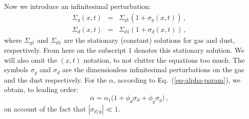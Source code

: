 \documentclass{aa}
\def\comma{\,,}
\begin{document}
Now we introduce an infinitesimal perturbation:
\begin{eqnarray}
\Sigma_g(x,t) &=& \Sigma_{g1} (1+\sigma_g(x,t))\comma\label{eq-simpl-sigma-g-pert}\\
\Sigma_d(x,t) &=& \Sigma_{d1} (1+\sigma_d(x,t))\comma\label{eq-simpl-sigma-d-pert}
\end{eqnarray}
where $\Sigma_{g1}$ and $\Sigma_{d1}$ are the stationary (constant) solutions
for gas and dust, respectively. From here on the subscript $1$ denotes this
stationary solution. We will also omit the $(x,t)$ notation, to not clutter the
equations too much. The symbols $\sigma_g$ and $\sigma_d$ are the dimensionless
infinitesimal perturbations on the gas and the dust respectively. For the
$\alpha$, according to Eq.~(\ref{eq-alpha-param}), we 
obtain, to leading order:
\begin{equation}\label{eq-alpha-prescr}
\alpha = \alpha_1 \big(1+\phi_d\sigma_d+\phi_g\sigma_g\big)\comma
\end{equation}
on account of the fact that $|\sigma_{d/g}|\ll 1$.
\end{document}
